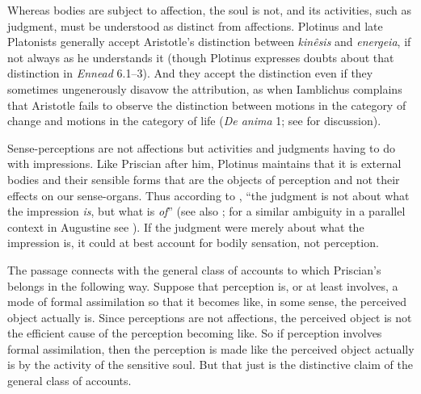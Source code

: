 \documentclass[12pt]{article}
\begin{document}
Whereas bodies are subject to affection, the soul is not, and its activities, such as judgment, must be understood as distinct from affections. Plotinus and late Platonists generally accept Aristotle's distinction between \emph{kinêsis} and \emph{energeia}, if not always as he understands it (though Plotinus expresses doubts about that distinction in \emph{Ennead} 6.1--3). And they accept the distinction even if they sometimes ungenerously disavow the attribution, as when Iamblichus complains that Aristotle fails to observe the distinction between motions in the category of change and motions in the category of life (\emph{De anima} 1; see \citealt[76--77]{Finamore:2002yf} for discussion). 

Sense-perceptions are not affections but activities and judgments having to do with impressions. Like Priscian after him, Plotinus maintains that it is external bodies and their sensible forms that are the objects of perception and not their effects on our sense-organs. Thus according to \citet[73]{Fleet:1995gf}, ``the judgment is not about what the impression \emph{is}, but what is \emph{of}'' (see also \citealt[75 n.28]{Emilsson:1988uq}; for a similar ambiguity in a parallel context in Augustine see \citealt{Brittain:2002hl}). If the judgment were merely about what the impression is, it could at best account for bodily sensation, not perception. 

The passage connects with the general class of accounts to which Priscian's belongs in the following way. Suppose that perception is, or at least involves, a mode of formal assimilation so that it becomes like, in some sense, the perceived object actually is. Since perceptions are not affections, the perceived object is not the efficient cause of the perception becoming like. So if perception involves formal assimilation, then the perception is made like the perceived object actually is by the activity of the sensitive soul. But that just is the distinctive claim of the general class of accounts.
\end{document}
